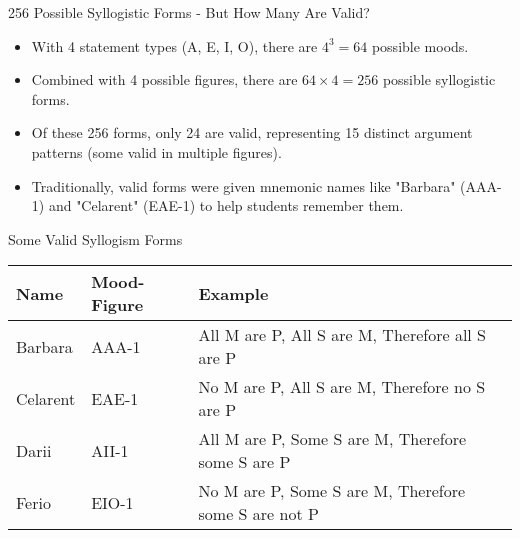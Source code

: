 \documentclass{beamer}
\begin{document}
	\begin{frame}{256 Possible Syllogistic Forms - But How Many Are Valid?}
		\begin{itemize}
			\item With 4 statement types (A, E, I, O), there are $4^3 = 64$ possible moods.
			\item Combined with 4 possible figures, there are $64 \times 4 = 256$ possible syllogistic forms.
			\item Of these 256 forms, only 24 are valid, representing 15 distinct argument patterns (some valid in multiple figures).
			\item Traditionally, valid forms were given mnemonic names like "Barbara" (AAA-1) and "Celarent" (EAE-1) to help students remember them.
		\end{itemize}
		
		\begin{block}{Some Valid Syllogism Forms}
			\scriptsize
			\begin{tabular}{|l|l|l|}
				\hline
				\textbf{Name} & \textbf{Mood-Figure} & \textbf{Example} \\
				\hline
				Barbara & AAA-1 & All M are P, All S are M, Therefore all S are P \\
				Celarent & EAE-1 & No M are P, All S are M, Therefore no S are P \\
				Darii & AII-1 & All M are P, Some S are M, Therefore some S are P \\
				Ferio & EIO-1 & No M are P, Some S are M, Therefore some S are not P \\
				\hline
			\end{tabular}
		\end{block}
	\end{frame}
	
\end{document}
